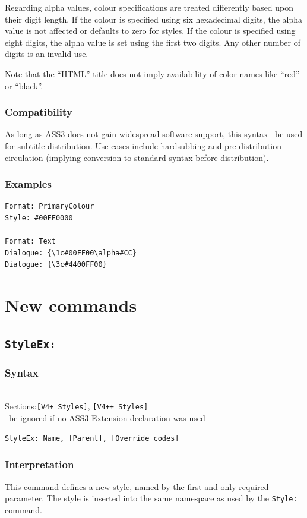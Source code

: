 \documentclass{spec}
\newcommand{\syntax}[1]{
	\subsubsection*{Syntax}
	\begin{tabbing}
	\hspace{2cm}\=\\[-16pt]
	#1
	\end{tabbing}
}
\gdef\compat{}
\newcommand{\mustuse}[1]{\must\ be ignored if no ASS3 Extension declaration was used%
\gappto{\compat}{\hspace{9pt} #1 & \textbf{required}\\[3pt]}}
\newcommand{\secspecs}[2]{Sections:\>\texttt{#1}, \texttt{#2}}
\begin{document}
Regarding alpha values, colour specifications are treated differently
based upon their digit length. If the colour is specified using six
hexadecimal digits, the alpha value is not affected or defaults to zero
for styles. If the colour is specified using eight digits, the alpha
value is set using the first two digits. Any other number of digits
is an invalid use.

Note that the ``HTML'' title does not imply availability of color names
like ``red'' or ``black''.

\subsubsection*{Compatibility}
As long as ASS3 does not gain widespread software support, this syntax
\shouldnot\ be used for subtitle distribution. Use cases include
hardsubbing and pre-distribution circulation (implying conversion to
standard syntax before distribution).

\subsubsection*{Examples}
\begin{verbatim}
Format: PrimaryColour
Style: #00FF0000

Format: Text
Dialogue: {\1c#00FF00\alpha#CC}
Dialogue: {\3c#4400FF00}
\end{verbatim}

\section{New commands}
\subsection{\texttt{StyleEx:}}
\syntax{
	\secspecs{[V4+ Styles]}{[V4++ Styles]}\\
	\mustuse{StyleEx}
}

\begin{verbatim}
StyleEx: Name, [Parent], [Override codes]
\end{verbatim}

\subsubsection*{Interpretation}
This command defines a new style, named by the first and only required
parameter. The style is inserted into the same namespace as used by the
\verb!Style:! command.
\end{document}
